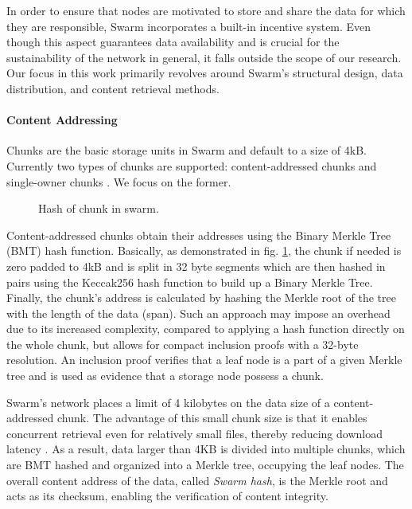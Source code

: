 In order to ensure that nodes are motivated to store and share the data for which they are responsible, Swarm incorporates a built-in incentive system. Even though this aspect guarantees data availability and is crucial for the sustainability of the network in general, it falls outside the scope of our research. Our focus in this work primarily revolves around Swarm's structural design, data distribution, and content retrieval methods.

\paragraph{Content Addressing}\label{par:chunks_swarm}

Chunks are the basic storage units in Swarm and default to a size of 4kB. Currently two types of chunks are supported: content-addressed chunks and single-owner chunks \citep{swarm_team_2021}. We focus on the former.

\begin{figure}[htbp]
    \centering
    \resizebox{1\textwidth}{!}{
    }
    \caption{Hash of chunk in swarm. \citep{tron_2020}}
    \label{fig:bmt}
 \end{figure}

Content-addressed chunks obtain their addresses using the Binary Merkle Tree (BMT) hash function. Basically, as demonstrated in fig. \ref{fig:bmt}, the chunk if needed is zero padded to 4kB and is split in 32 byte segments which are then hashed in pairs using the Keccak256 hash function to build up a Binary Merkle Tree. Finally, the chunk's address is calculated by hashing the Merkle root of the tree with the length of the data (span). Such an approach may impose an overhead due to its increased complexity, compared to applying a hash function directly on the whole chunk, but allows for compact inclusion proofs with a 32-byte resolution. An inclusion proof verifies that a leaf node is a part of a given Merkle tree \citep{wikipedia_2023} and is used as evidence that a storage node possess a chunk.

Swarm's network places a limit of 4 kilobytes on the data size of a content-addressed chunk. The advantage of this small chunk size is that it enables concurrent retrieval even for relatively small files, thereby reducing download latency \citep[p.~38]{tron_2020}. As a result, data larger than 4KB is divided into multiple chunks, which are BMT hashed and organized into a Merkle tree, occupying the leaf nodes. The overall content address of the data, called \textit{Swarm hash}, is the Merkle root and acts as its checksum, enabling the verification of content integrity.

